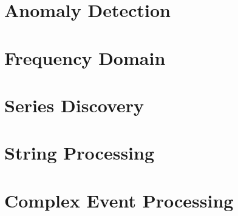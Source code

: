 \documentclass[11pt,color=green,table]{elegantbook}
\begin{document}
\chapter{Anomaly Detection}







\chapter{Frequency Domain}









\chapter{Series Discovery}




\chapter{String Processing}





\chapter{Complex Event Processing}







\end{document}
